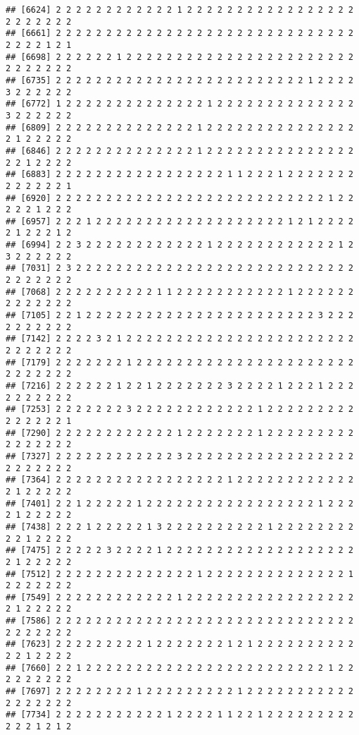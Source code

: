 \documentclass[
]{article}
\begin{document}
\begin{verbatim}
## [6624] 2 2 2 2 2 2 2 2 2 2 2 2 1 2 2 2 2 2 2 2 2 2 2 2 2 2 2 2 2 2 2 2 2 2 2 2 2
## [6661] 2 2 2 2 2 2 2 2 2 2 2 2 2 2 2 2 2 2 2 2 2 2 2 2 2 2 2 2 2 2 2 2 2 2 1 2 1
## [6698] 2 2 2 2 2 2 1 2 2 2 2 2 2 2 2 2 2 2 2 2 2 2 2 2 2 2 2 2 2 2 2 2 2 2 2 2 2
## [6735] 2 2 2 2 2 2 2 2 2 2 2 2 2 2 2 2 2 2 2 2 2 2 2 2 2 1 2 2 2 2 3 2 2 2 2 2 2
## [6772] 1 2 2 2 2 2 2 2 2 2 2 2 2 2 2 1 2 2 2 2 2 2 2 2 2 2 2 2 2 2 3 2 2 2 2 2 2
## [6809] 2 2 2 2 2 2 2 2 2 2 2 2 2 2 1 2 2 2 2 2 2 2 2 2 2 2 2 2 2 2 2 1 2 2 2 2 2
## [6846] 2 2 2 2 2 2 2 2 2 2 2 2 2 2 1 2 2 2 2 2 2 2 2 2 2 2 2 2 2 2 2 2 1 2 2 2 2
## [6883] 2 2 2 2 2 2 2 2 2 2 2 2 2 2 2 2 2 1 1 2 2 2 1 2 2 2 2 2 2 2 2 2 2 2 2 2 1
## [6920] 2 2 2 2 2 2 2 2 2 2 2 2 2 2 2 2 2 2 2 2 2 2 2 2 2 2 2 1 2 2 2 2 2 1 2 2 2
## [6957] 2 2 2 1 2 2 2 2 2 2 2 2 2 2 2 2 2 2 2 2 2 2 2 1 2 1 2 2 2 2 2 1 2 2 2 1 2
## [6994] 2 2 3 2 2 2 2 2 2 2 2 2 2 2 2 1 2 2 2 2 2 2 2 2 2 2 2 2 1 2 3 2 2 2 2 2 2
## [7031] 2 3 2 2 2 2 2 2 2 2 2 2 2 2 2 2 2 2 2 2 2 2 2 2 2 2 2 2 2 2 2 2 2 2 2 2 2
## [7068] 2 2 2 2 2 2 2 2 2 2 1 1 2 2 2 2 2 2 2 2 2 2 2 1 2 2 2 2 2 2 2 2 2 2 2 2 2
## [7105] 2 2 1 2 2 2 2 2 2 2 2 2 2 2 2 2 2 2 2 2 2 2 2 2 2 2 3 2 2 2 2 2 2 2 2 2 2
## [7142] 2 2 2 2 3 2 1 2 2 2 2 2 2 2 2 2 2 2 2 2 2 2 2 2 2 2 2 2 2 2 2 2 2 2 2 2 2
## [7179] 2 2 2 2 2 2 2 1 2 2 2 2 2 2 2 2 2 2 2 2 2 2 2 2 2 2 2 2 2 2 2 2 2 2 2 2 2
## [7216] 2 2 2 2 2 2 1 2 2 1 2 2 2 2 2 2 2 3 2 2 2 2 1 2 2 2 1 2 2 2 2 2 2 2 2 2 2
## [7253] 2 2 2 2 2 2 2 3 2 2 2 2 2 2 2 2 2 2 2 2 1 2 2 2 2 2 2 2 2 2 2 2 2 2 2 2 1
## [7290] 2 2 2 2 2 2 2 2 2 2 2 2 1 2 2 2 2 2 2 2 1 2 2 2 2 2 2 2 2 2 2 2 2 2 2 2 2
## [7327] 2 2 2 2 2 2 2 2 2 2 2 2 3 2 2 2 2 2 2 2 2 2 2 2 2 2 2 2 2 2 2 2 2 2 2 2 2
## [7364] 2 2 2 2 2 2 2 2 2 2 2 2 2 2 2 2 2 1 2 2 2 2 2 2 2 2 2 2 2 2 2 1 2 2 2 2 2
## [7401] 2 2 1 2 2 2 2 2 1 2 2 2 2 2 2 2 2 2 2 2 2 2 2 2 2 2 1 2 2 2 2 1 2 2 2 2 2
## [7438] 2 2 2 1 2 2 2 2 2 1 3 2 2 2 2 2 2 2 2 2 2 1 2 2 2 2 2 2 2 2 2 2 1 2 2 2 2
## [7475] 2 2 2 2 2 3 2 2 2 2 1 2 2 2 2 2 2 2 2 2 2 2 2 2 2 2 2 2 2 2 2 1 2 2 2 2 2
## [7512] 2 2 2 2 2 2 2 2 2 2 2 2 2 2 1 2 2 2 2 2 2 2 2 2 2 2 2 2 2 1 2 2 2 2 2 2 2
## [7549] 2 2 2 2 2 2 2 2 2 2 2 2 1 2 2 2 2 2 2 2 2 2 2 2 2 2 2 2 2 2 2 1 2 2 2 2 2
## [7586] 2 2 2 2 2 2 2 2 2 2 2 2 2 2 2 2 2 2 2 2 2 2 2 2 2 2 2 2 2 2 2 2 2 2 2 2 2
## [7623] 2 2 2 2 2 2 2 2 2 1 2 2 2 2 2 2 2 1 2 1 2 2 2 2 2 2 2 2 2 2 2 2 1 2 2 2 2
## [7660] 2 2 1 2 2 2 2 2 2 2 2 2 2 2 2 2 2 2 2 2 2 2 2 2 2 2 2 1 2 2 2 2 2 2 2 2 2
## [7697] 2 2 2 2 2 2 2 2 1 2 2 2 2 2 2 2 2 2 1 2 2 2 2 2 2 2 2 2 2 2 2 2 2 2 2 2 2
## [7734] 2 2 2 2 2 2 2 2 2 2 2 1 2 2 2 2 1 1 2 2 1 2 2 2 2 2 2 2 2 2 2 2 2 1 2 1 2

\end{verbatim}
\end{document}
